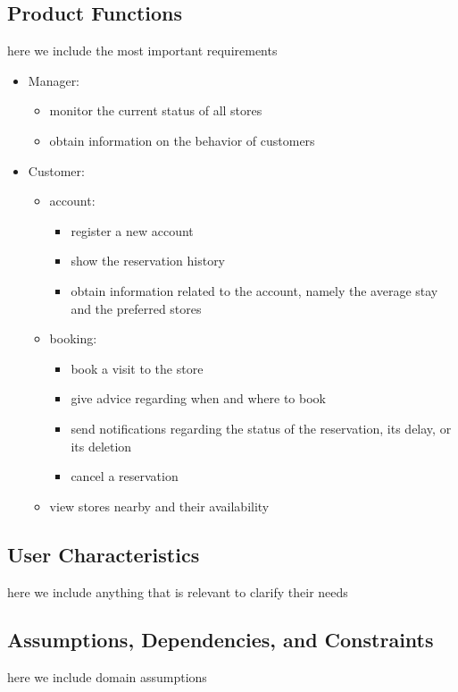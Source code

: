 \subsection{Product Functions}
here we include the most important requirements

\begin{itemize}
    \item Manager:
    \begin{itemize}
        \item monitor the current status of all stores
        \item obtain information on the behavior of customers
    \end{itemize}
    \item Customer:
    \begin{itemize}
        \item account:
        \begin{itemize}
            \item register a new account
            \item show the reservation history
            \item obtain information related to the account, namely the average stay and the preferred stores
        \end{itemize}
        \item booking:
        \begin{itemize}
            \item book a visit to the store
            \item give advice regarding when and where to book
            \item send notifications regarding the status of the reservation, its delay, or its deletion
            \item cancel a reservation
        \end{itemize}
        \item view stores nearby and their availability
    \end{itemize}
\end{itemize}
\subsection{User Characteristics}
here we include anything that is relevant to clarify their needs

\subsection{Assumptions, Dependencies, and Constraints}
here we include domain assumptions 